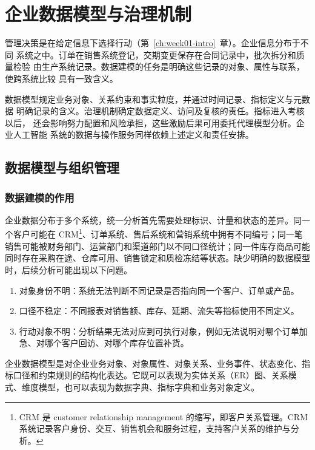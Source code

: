 \chapter{企业数据模型与治理机制}
\label{ch:week02-enterprise-data-model}

管理决策是在给定信息下选择行动（第~\ref{ch:week01-intro}~章）。企业信息分布于不同
系统之中。订单在销售系统登记，交期变更保存在合同记录中，批次拆分和质量检验
由生产系统记录。数据建模的任务是明确这些记录的对象、属性与联系，使跨系统比较
具有一致含义。

数据模型规定业务对象、关系约束和事实粒度，并通过时间记录、指标定义与元数据
明确记录的含义。治理机制确定数据定义、访问及复核的责任。指标进入考核以后，
还会影响努力配置和风险承担，这些激励后果可用委托代理模型分析。企业人工智能
系统的数据与操作服务同样依赖上述定义和责任安排。

\section{数据模型与组织管理}
\subsection{数据建模的作用}

企业数据分布于多个系统，统一分析首先需要处理标识、计量和状态的差异。同一个客户可能在 CRM\footnote{CRM 是 customer relationship management 的缩写，即客户关系管理。CRM 系统记录客户身份、交互、销售机会和服务过程，支持客户关系的维护与分析。}、订单系统、售后系统和营销系统中拥有不同编号；同一笔销售可能被财务部门、运营部门和渠道部门以不同口径统计；同一件库存商品可能同时存在采购在途、仓库可用、销售锁定和质检冻结等状态。缺少明确的数据模型时，后续分析可能出现以下问题。

\begin{enumerate}
  \item 对象身份不明：系统无法判断不同记录是否指向同一个客户、订单或产品。
  \item 口径不稳定：不同报表对销售额、库存、延期、流失等指标使用不同定义。
  \item 行动对象不明：分析结果无法对应到可执行对象，例如无法说明对哪个订单加急、对哪个客户回访、对哪个库存位置补货。
\end{enumerate}

\begin{definition}[企业数据模型]
企业数据模型是对企业业务对象、对象属性、对象关系、业务事件、状态变化、指标口径和约束规则的结构化表达。它既可以表现为实体关系（ER）图、关系模式、维度模型，也可以表现为数据字典、指标字典和业务对象定义。
\end{definition}

